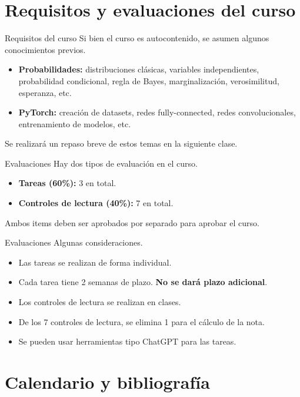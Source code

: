 \documentclass{beamer}
\begin{document}
\section{Requisitos y evaluaciones del curso}

\begin{frame}{Requisitos del curso}
    Si bien el curso es autocontenido, se asumen algunos conocimientos previos.
    \begin{itemize}
        \item \textbf{Probabilidades:} distribuciones clásicas, variables independientes, probabilidad condicional, regla de Bayes, marginalización, verosimilitud, esperanza, etc.
        \item \textbf{PyTorch:} creación de datasets, redes fully-connected, redes convolucionales, entrenamiento de modelos, etc.
    \end{itemize}
    Se realizará un repaso breve de estos temas en la siguiente clase.
\end{frame}

\begin{frame}{Evaluaciones}
    Hay dos tipos de evaluación en el curso.
    \begin{itemize}
        \item \textbf{Tareas (60\%):} 3 en total.
        \item \textbf{Controles de lectura (40\%):} 7 en total.
    \end{itemize}
    Ambos items deben ser aprobados por separado para aprobar el curso.
\end{frame}

\begin{frame}{Evaluaciones}
    Algunas consideraciones.
    \begin{itemize}
        \item Las tareas se realizan de forma individual.
        \item Cada tarea tiene 2 semanas de plazo. \textbf{No se dará plazo adicional}.
        \item Los controles de lectura se realizan en clases.
        \item De los 7 controles de lectura, se elimina 1 para el cálculo de la nota.
        \item Se pueden usar herramientas tipo ChatGPT para las tareas.
    \end{itemize}
\end{frame}

\section{Calendario y bibliografía}
\end{document}

